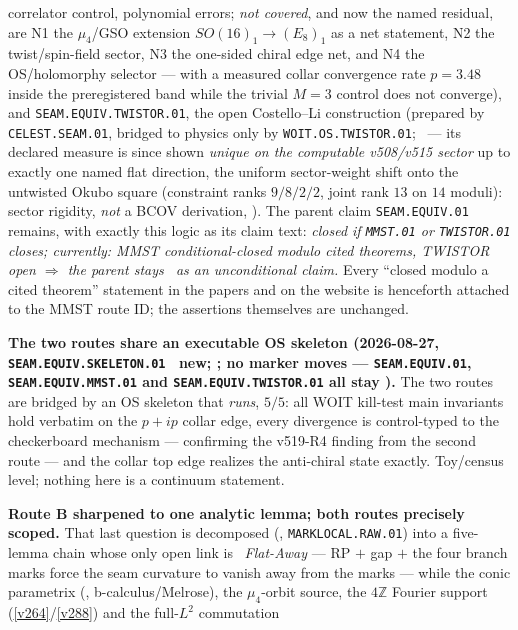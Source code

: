 \documentclass[11pt,a4paper]{article}
\newcommand{\Z}{\mathbb Z}
\begin{document}
\begin{keybox}
correlator control, polynomial errors; \emph{not covered}, and now the named residual, are
N1 the $\mu_4$/GSO extension $SO(16)_1\to(E_8)_1$ as a net statement, N2 the twist/spin-field
sector, N3 the one-sided chiral edge net, and N4 the OS/holomorphy selector --- with a measured
collar convergence rate $p=3.48$ inside the preregistered band while the trivial $M{=}3$ control
does not converge), and \texttt{SEAM.EQUIV.TWISTOR.01}, the open
Costello--Li construction (prepared by \texttt{CELEST.SEAM.01}, bridged to physics only by
\texttt{WOIT.OS.TWISTOR.01}; \mO\ --- its declared measure is since shown \emph{unique on the
computable v508/v515 sector} up to exactly one named flat direction, the uniform sector-weight
shift onto the untwisted Okubo square (constraint ranks $9/8/2/2$, joint rank $13$ on $14$
moduli): sector rigidity, \emph{not} a BCOV derivation,
). The parent claim \texttt{SEAM.EQUIV.01} remains, with exactly this
logic as its claim text: \emph{closed if \texttt{MMST.01} or \texttt{TWISTOR.01} closes; currently:
MMST conditional-closed modulo cited theorems, TWISTOR open $\Rightarrow$ the parent stays \mO\ as an
unconditional claim.} Every ``closed modulo a cited theorem'' statement in the papers and on the
website is henceforth attached to the MMST route ID; the assertions themselves are unchanged.
\par\smallskip\noindent\textbf{The two routes share an executable OS skeleton (2026-08-27,
\texttt{SEAM.EQUIV.SKELETON.01} \mE\ new; ; no marker
moves --- \texttt{SEAM.EQUIV.01}, \texttt{SEAM.EQUIV.MMST.01} and
\texttt{SEAM.EQUIV.TWISTOR.01} all stay \mO).} The two routes are bridged by an OS skeleton
that \emph{runs}, $5/5$: all WOIT kill-test main invariants hold verbatim on the $p{+}ip$
collar edge, every divergence is control-typed to the checkerboard mechanism --- confirming
the v519-R4 finding from the second route --- and the collar top edge realizes the
anti-chiral state exactly. Toy/census level; nothing here is a continuum statement.
\par\smallskip\noindent\textbf{Route B sharpened to one analytic lemma; both routes precisely scoped.}
That last question is decomposed (, \texttt{MARKLOCAL.RAW.01}) into a five-lemma
chain whose only open link is \mO\ \emph{Flat-Away} --- RP $+$ gap $+$ the four branch marks force the seam
curvature to vanish away from the marks --- while the conic parametrix (\mC, b-calculus/Melrose), the
$\mu_4$-orbit source, the $4\Z$ Fourier support (\vref{v264}/\vref{v288}) and the full-$L^2$ commutation

\end{keybox}
\end{document}
